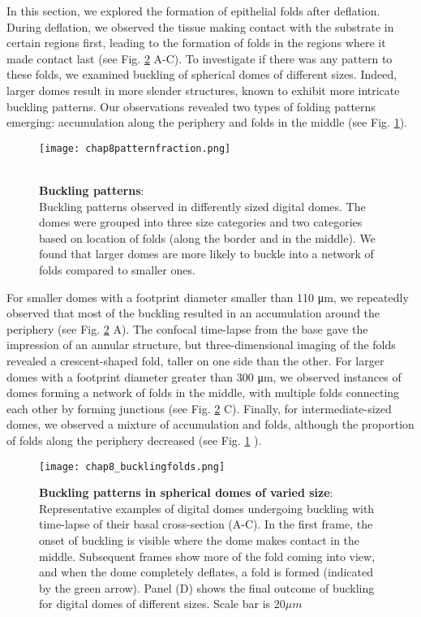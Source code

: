 In this section, we explored the formation of epithelial folds after deflation. During deflation, we observed the tissue making contact with the substrate in certain regions first, leading to the formation of folds in the regions where it made contact last (see Fig. \ref{fig_8_6} A-C). To investigate if there was any pattern to these folds, we examined buckling of spherical domes of different sizes. Indeed, larger domes result in more slender structures, known to exhibit more intricate buckling patterns. Our observations revealed two types of folding patterns emerging: accumulation along the periphery and folds in the middle (see Fig. \ref{fig_8_5}).

\begin{figure}[h!]
	\begin{minipage}[c]{0.5\textwidth}
		\texttt{[image: chap8patternfraction.png]}
	\end{minipage}\hfill
	\begin{minipage}[c]{0.45\textwidth}
		\caption{\\ \textbf{Buckling patterns}:\\ 
			Buckling patterns observed in differently sized digital domes. The domes were grouped into three size categories and two categories based on location of folds (along the border and in the middle). We found that larger domes are more likely to buckle into a network of folds compared to smaller ones.
		} \label{fig_8_5}
	\end{minipage}
\end{figure}

For smaller domes with a footprint diameter smaller than 110 \unit{\um}, we repeatedly observed that most of the buckling resulted in an accumulation around the periphery (see Fig. \ref{fig_8_6} A). The confocal time-lapse from the base gave the impression of an annular structure, but three-dimensional imaging of the folds revealed a crescent-shaped fold, taller on one side than the other. For larger domes with a footprint diameter greater than 300 \unit{\um}, we observed instances of domes forming a network of folds in the middle, with multiple folds connecting each other by forming junctions (see Fig. \ref{fig_8_6} C). Finally, for intermediate-sized domes, we observed a mixture of accumulation and folds, although the proportion of folds along the periphery decreased (see Fig. \ref{fig_8_5} ).

\begin{figure}[h!]
	\centering
	\texttt{[image: chap8\_bucklingfolds.png]}
	\caption{\label{fig_8_6} \textbf{Buckling patterns in spherical domes of varied size}: Representative examples of digital domes undergoing buckling with time-lapse of their basal cross-section (A-C). In the first frame, the onset of buckling is visible where the dome makes contact in the middle. Subsequent frames show more of the fold coming into view, and when the dome completely deflates, a fold is formed (indicated by the green arrow). Panel (D) shows the final outcome of buckling for digital domes of different sizes. Scale bar is $20 \mu m$	}
\end{figure}
\clearpage

